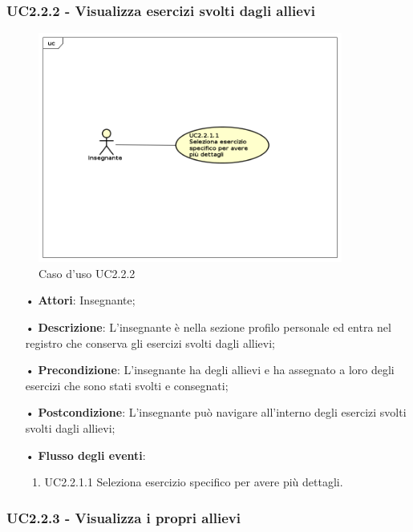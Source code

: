 \subsubsection{UC2.2.2 - Visualizza esercizi svolti dagli allievi}
\begin{figure}[H]
\centering
\includegraphics[width=10cm]{img/UC222.png} 
\caption{Caso d'uso UC2.2.2}
\end{figure}
\begin{itemize}
	\item[•] \textbf{Attori}: Insegnante;
	\item[•] \textbf{Descrizione}:  L’insegnante è nella sezione profilo personale ed entra
		nel registro che conserva gli esercizi svolti dagli allievi;
	\item[•] \textbf{Precondizione}:  L’insegnante ha degli allievi e ha assegnato a loro degli esercizi che sono stati svolti e consegnati;

	\item[•] \textbf{Postcondizione}: L’insegnante può navigare all’interno degli esercizi svolti 
                       svolti dagli allievi; 

	\item[•] \textbf{Flusso degli eventi}:
		\begin{enumerate}
			\item UC2.2.1.1  Seleziona esercizio specifico per avere più dettagli.	
		\end{enumerate}
\end{itemize}

\subsubsection{UC2.2.3 - Visualizza i propri allievi}

